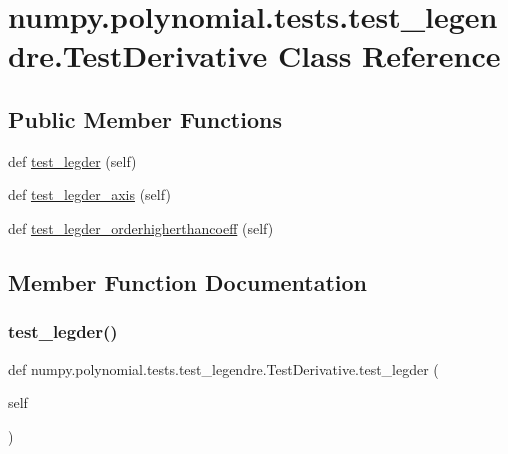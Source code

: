 \hypertarget{classnumpy_1_1polynomial_1_1tests_1_1test__legendre_1_1TestDerivative}{}\section{numpy.\+polynomial.\+tests.\+test\+\_\+legendre.\+Test\+Derivative Class Reference}
\label{classnumpy_1_1polynomial_1_1tests_1_1test__legendre_1_1TestDerivative}
\subsection*{Public Member Functions}
\begin{DoxyCompactItemize}
\item 
def \hyperlink{classnumpy_1_1polynomial_1_1tests_1_1test__legendre_1_1TestDerivative_afe68b64818e3089c8b0eec36bb7789e3}{test\+\_\+legder} (self)
\item 
def \hyperlink{classnumpy_1_1polynomial_1_1tests_1_1test__legendre_1_1TestDerivative_ad451bd7045cd3b157fceb438c12480f7}{test\+\_\+legder\+\_\+axis} (self)
\item 
def \hyperlink{classnumpy_1_1polynomial_1_1tests_1_1test__legendre_1_1TestDerivative_a44f4200b7c34f1b96870cd6cece159d4}{test\+\_\+legder\+\_\+orderhigherthancoeff} (self)
\end{DoxyCompactItemize}


\subsection{Member Function Documentation}
\mbox{\label{classnumpy_1_1polynomial_1_1tests_1_1test__legendre_1_1TestDerivative_afe68b64818e3089c8b0eec36bb7789e3}} 
\subsubsection{\texorpdfstring{test\+\_\+legder()}{test\_legder()}}
{\footnotesize\ttfamily def numpy.\+polynomial.\+tests.\+test\+\_\+legendre.\+Test\+Derivative.\+test\+\_\+legder (\begin{DoxyParamCaption}\item[{}]{self }\end{DoxyParamCaption})}

